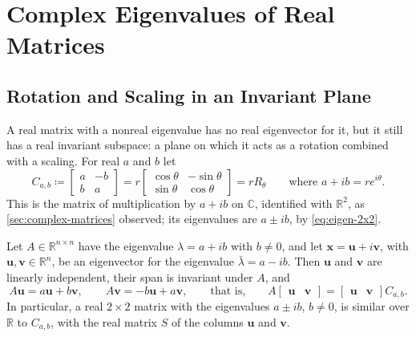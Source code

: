 \section{Complex Eigenvalues of Real Matrices}
\label{sec:complex-eigenvalues}

\subsection{Rotation and Scaling in an Invariant Plane}

A real matrix with a nonreal eigenvalue has no real eigenvector for it, but it still has a real invariant subspace: a plane on which it acts as a rotation combined with a scaling. For real $a$ and $b$ let
\[
C_{a,b}\coloneqq\begin{bmatrix}a&-b\\b&a\end{bmatrix}=r\begin{bmatrix}\cos\theta&-\sin\theta\\\sin\theta&\cos\theta\end{bmatrix}=rR_\theta\qquad\text{where }a+ib=re^{i\theta}.
\]
This is the matrix of multiplication by $a+ib$ on $\mathbb C$, identified with $\mathbb R^2$, as \cref{sec:complex-matrices} observed; its eigenvalues are $a\pm ib$, by \eqref{eq:eigen-2x2}.

\begin{proposition}
\label{prop:real-2x2-form}
Let $A\in\mathbb R^{n\times n}$ have the eigenvalue $\lambda=a+ib$ with $b\ne0$, and let $\mathbf x=\mathbf u+i\mathbf v$, with $\mathbf u,\mathbf v\in\mathbb R^n$, be an eigenvector for the eigenvalue $\bar\lambda=a-ib$. Then $\mathbf u$ and $\mathbf v$ are linearly independent, their span is invariant under $A$, and
\[
A\mathbf u=a\mathbf u+b\mathbf v,\qquad A\mathbf v=-b\mathbf u+a\mathbf v,\qquad\text{that is,}\qquad A\begin{bmatrix}\mathbf u&\mathbf v\end{bmatrix}=\begin{bmatrix}\mathbf u&\mathbf v\end{bmatrix}C_{a,b}.
\]
In particular, a real $2\times2$ matrix with the eigenvalues $a\pm ib$, $b\ne0$, is similar over $\mathbb R$ to $C_{a,b}$, with the real matrix $S$ of the columns $\mathbf u$ and $\mathbf v$.
\end{proposition}

